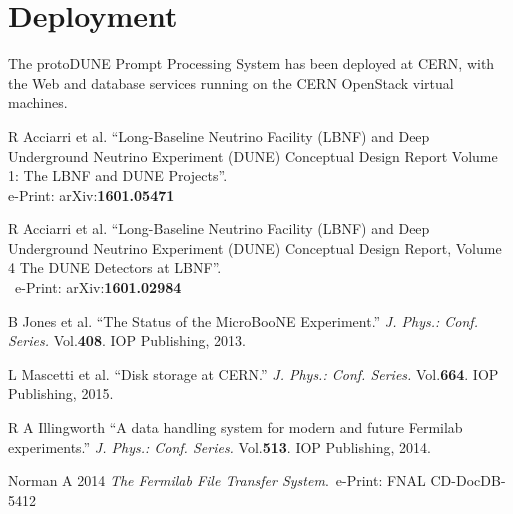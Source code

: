 \documentclass{PoS}
\newcommand{\pd}{protoDUNE\xspace}
\begin{document}
\section{Deployment}
The \pd Prompt Processing System has been deployed at CERN, with the Web and database services running
on the CERN OpenStack virtual machines.


\begin{thebibliography}{99}



R Acciarri et al.
``Long-Baseline Neutrino Facility (LBNF) and Deep Underground Neutrino Experiment (DUNE) Conceptual Design Report Volume 1: The LBNF and DUNE Projects''.\\ e-Print: arXiv:\textbf{1601.05471}

R Acciarri et al.
``Long-Baseline Neutrino Facility (LBNF) and Deep Underground Neutrino Experiment (DUNE) Conceptual Design Report, Volume 4 The DUNE Detectors at LBNF''.\\~e-Print: arXiv:\textbf{1601.02984}


B Jones et al.  ``The Status of the MicroBooNE Experiment.''  \textit{J. Phys.: Conf. Series.} Vol.\textbf{408}. IOP Publishing, 2013.

 L Mascetti et al. ``Disk storage at CERN.'' \textit{J. Phys.: Conf. Series.} Vol.\textbf{664}. IOP Publishing, 2015.








R A Illingworth ``A data handling system for modern and future Fermilab experiments.''  \textit{J. Phys.: Conf. Series.} Vol.\textbf{513}. IOP Publishing, 2014.

Norman A 2014 \textit{The Fermilab File Transfer System}.~e-Print: FNAL CD-DocDB-5412



\end{thebibliography}
\end{document}
